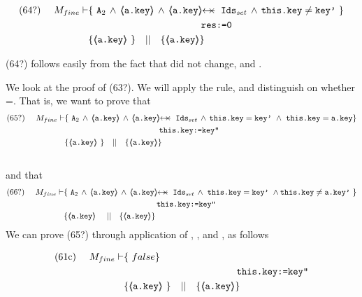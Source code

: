 \begin{proofO}
\begin{align*}
\text{(64?)}  \ \ \ \ M_{fine} \vdash 
		&	\{  \ \Alocalssets\,\wedge\, {\inside{\prg{a.key}}} \, \wedge \, \protectedFrom {\prg{a.key}} {\Idsset} \, \wedge  \,  \prg{this.key}\neq\prg{key'}\  \} \\
		& \SPT\SPT   \SPT\SPT  \prg{res:=0} \\
		& \{ {\inside{\prg{a.key}}}\   \} \ \ \  || \ \ \ 
		   \{ {\inside{\prg{a.key}}} \}
\end{align*}

(64?) follows easily from  the fact that  did not change, and  {}.

\vspace{.5cm}
We look at the proof of (63?).  We will apply the {} rule, and distinguish on whether =. That is, we want to prove that\\
\small{
\begin{align*}
\text{(65?)}  \ \ \ \ M_{fine} \vdash 
		&	\{  \ \Alocalssets\,\wedge\, {\inside{\prg{a.key}}} \, \wedge \, \protectedFrom {\prg{a.key}} {\Idsset} \, \wedge  \,  \prg{this.key}=\prg{key'}\ \wedge\ \prg{this.key}=\prg{a.key}  \} \\
			& \SPT \SPT   \SPT\SPT  \prg{this.key:=key''} \\
	       	& \{ {\inside{\prg{a.key}}}\   \} \ \ \  || \ \ \ 
		   \{ {\inside{\prg{a.key}}} \}
\end{align*}
}
\\
and that
\\
\small{
\begin{align*}
\text{(66?)}  \ \ \ \ M_{fine} \vdash 
		&	\{  \ \Alocalssets\,\wedge\, {\inside{\prg{a.key}}} \, \wedge \, \protectedFrom {\prg{a.key}} {\Idsset} \, \wedge  \,   \,  \prg{this.key}=\prg{key'}\  \wedge \prg{this.key}\neq\prg{a.key'}\  \} \\
		& \SPT \SPT   \SPT\SPT  \prg{this.key:=key''} \\
		& \{ {\inside{\prg{a.key}}}\   \ \ \  || \ \ \ 
		   \{ {\inside{\prg{a.key}}} \}
\end{align*}
}
\vspace{.2cm}
\normalsize
We can prove (65?) through application of {}, {}, and {}, as follows

\begin{align*}
\text{(61c)}  \ \ \ \ M_{fine} \vdash 
		&	\{  \ false  \} \\
		& \SPT \SPT   \SPT\SPT  \prg{this.key:=key''} \\
		& \{ {\inside{\prg{a.key}}}\   \} \ \ \  || \ \ \ 
		   \{ {\inside{\prg{a.key}}} \}
\end{align*}


\end{proofO}
